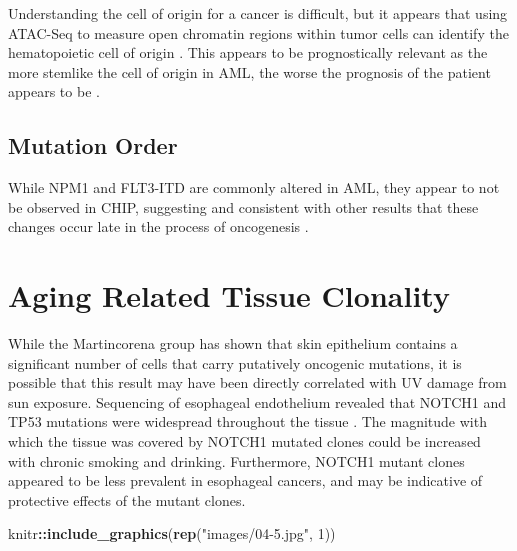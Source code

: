 \documentclass[]{book}
\newenvironment{Shaded}{\begin{snugshade}}{\end{snugshade}}
\newcommand{\KeywordTok}[1]{\textcolor[rgb]{0.13,0.29,0.53}{\textbf{#1}}}
\newcommand{\DecValTok}[1]{\textcolor[rgb]{0.00,0.00,0.81}{#1}}
\newcommand{\StringTok}[1]{\textcolor[rgb]{0.31,0.60,0.02}{#1}}
\newcommand{\OperatorTok}[1]{\textcolor[rgb]{0.81,0.36,0.00}{\textbf{#1}}}
\newcommand{\NormalTok}[1]{#1}
\begin{document}
Understanding the cell of origin for a cancer is difficult, but it
appears that using ATAC-Seq to measure open chromatin regions within
tumor cells can identify the hematopoietic cell of origin
\citep{george2016leukaemia}. This appears to be prognostically relevant
as the more stemlike the cell of origin in AML, the worse the prognosis
of the patient appears to be \citep{young2016open}.

\subsection{Mutation Order}\label{mutation-order}

While NPM1 and FLT3-ITD are commonly altered in AML, they appear to not
be observed in CHIP, suggesting and consistent with other results that
these changes occur late in the process of oncogenesis
\citep{mckerrell2015leukemia, kronke2013clonal, abelson2018prediction}.

\section{Aging Related Tissue
Clonality}\label{aging-related-tissue-clonality}

While the Martincorena group has shown that skin epithelium contains a
significant number of cells that carry putatively oncogenic mutations,
it is possible that this result may have been directly correlated with
UV damage from sun exposure. Sequencing of esophageal endothelium
revealed that NOTCH1 and TP53 mutations were widespread throughout the
tissue \citep{yokoyama2019age, martincorena2018somatic}. The magnitude
with which the tissue was covered by NOTCH1 mutated clones could be
increased with chronic smoking and drinking. Furthermore, NOTCH1 mutant
clones appeared to be less prevalent in esophageal cancers, and may be
indicative of protective effects of the mutant clones.

\begin{Shaded}
\begin{Highlighting}[]
\NormalTok{knitr}\OperatorTok{::}\KeywordTok{include_graphics}\NormalTok{(}\KeywordTok{rep}\NormalTok{(}\StringTok{"images/04-5.jpg"}\NormalTok{, }\DecValTok{1}\NormalTok{))}
\end{Highlighting}
\end{Shaded}
\end{document}
